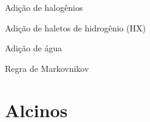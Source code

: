 \documentclass[presentation,professionalfonts,aspectratio=169]{beamer}
\begin{document}
\begin{frame}[label={sec:org99a8d53}]{Adição de halogênios}
\end{frame}



\begin{frame}[label={sec:orga995f57}]{Adição de haletos de hidrogênio (HX)}
\end{frame}


\begin{frame}[label={sec:org5e4e540}]{Adição de água}
\end{frame}


\begin{frame}[label={sec:orgef9c638}]{Regra de Markovnikov}
\end{frame}


\section{Alcinos}
\label{sec:org7417e5f}
\end{document}
